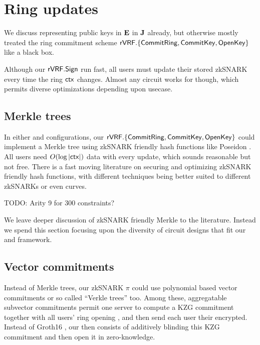 \section{Ring updates}
\label{sec:ring_updates}

We discuss \pifast representing public keys in ${\mathbf{E}}$ in ${\mathbf{J}}$ already,
but otherwise mostly treated the ring commitment scheme
${\mathsf{rVRF}}.\{ {\mathsf{CommitRing}}, {\mathsf{CommitKey}}, {\mathsf{OpenKey}} \}$ like a black box.

Although our ${\mathsf{rVRF}}.{\mathsf{Sign}}$ run fast, all users must update their
stored zkSNARK \pifast every time the ring $\mathsf{ctx}$ changes.
Almost any circuit works for \pifast though,
 which permits diverse optimizations depending upon usecase.


\subsection{Merkle trees} %

In either \pifast and \pisafe configurations, 
our ${\mathsf{rVRF}}.\{ {\mathsf{CommitRing}}, {\mathsf{CommitKey}}, {\mathsf{OpenKey}} \}$ could implement a
Merkle tree using zkSNARK friendly hash functions like Poseidon \cite{poseidon}.
%
All users need $O(\log |\mathsf{ctx}|)$ data with every update, which sounds
reasonable but not free.  There is a fast moving literature on securing
and optimizing zkSNARK friendly hash functions, with different techniques
being better suited to different zkSNARKs or even curves.

TODO: Arity 9 for 300 constraints?   %

We leave deeper discussion of zkSNARK friendly Merkle to the literature.
Instead we spend this section focusing upon the diversity of circuit
designs that fit our \pifast and \pisafe framework.


\subsection{Vector commitments}

Instead of Merkle trees, our zkSNARK $\pi$ could use polynomial based
vector commitments \cite{KZG} or so called ``Verkle trees'' \cite{??Verkle??} too.
%
Among these, aggregatable subvector commitments \cite{aSVC} permit
one server to compute a KZG commitment \comring together with all users'
ring opening \openring,  and then send each user their \openring encrypted.
Instead of Groth16 \cite{Groth16}, our \pisafe then consists
of additively blinding this KZG commitment and then open it in zero-knowledge.

